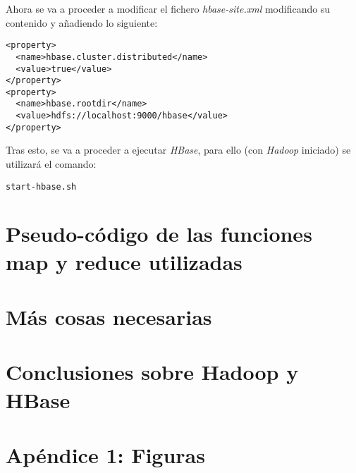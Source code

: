 \documentclass[11pt,a4paper]{article}
\begin{document}
Ahora se va a proceder a modificar el fichero \emph{hbase-site.xml} modificando su contenido y añadiendo lo siguiente:

\begin{lstlisting}
<property>
  <name>hbase.cluster.distributed</name>
  <value>true</value>
</property>
<property>
  <name>hbase.rootdir</name>
  <value>hdfs://localhost:9000/hbase</value>
</property>
\end{lstlisting}

Tras esto, se va a proceder a ejecutar \emph{HBase}, para ello (con \emph{Hadoop} iniciado) se utilizará el comando:

\begin{lstlisting}
start-hbase.sh
\end{lstlisting}


\section{Pseudo-código de las funciones map y reduce utilizadas}

\section{Más cosas necesarias}

\section{Conclusiones sobre Hadoop y HBase}

\newpage\section{Apéndice 1: Figuras}
\end{document}
